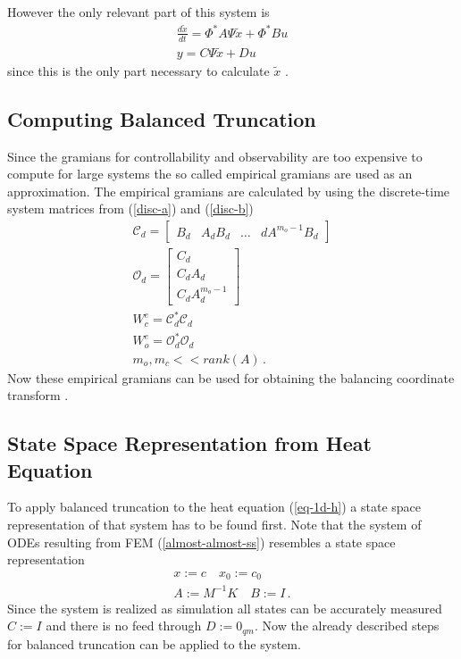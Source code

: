 However the only relevant part of this system is
\begin{gather}
\frac{d\tilde{x}}{dt} = \Phi^{*}A\Psi\tilde{x} + \Phi^{*}Bu \\
y = C\Psi\tilde{x} + Du  
\end{gather}
since this is the only part necessary to calculate \(\tilde{x}\)
\cite{brunton_kutz_2019e}.

\subsection{Computing Balanced Truncation}
Since the gramians for controllability and observability are too expensive to compute for large systems the so called empirical gramians are used as an approximation.
The empirical gramians are calculated by using the discrete-time system matrices from (\ref{disc-a}) and (\ref{disc-b})
\begin{gather}
\mathscr{C}_d = \begin{bmatrix}B_d & A_dB_d & \hdots & dA^{m_o -1}B_d\end{bmatrix} \\
\mathscr{O}_d = \begin{bmatrix}
C_d \\
C_dA_d \\
C_dA_d^{m_o - 1}
\end{bmatrix} \\
W_c^e = \mathscr{C}_d^{*}\mathscr{C}_d \\
W_o^e = \mathscr{O}_d^{*}\mathscr{O}_d \\
m_o, m_c << rank(A)  \,.
\end{gather}
Now these empirical gramians can be used for obtaining the balancing coordinate transform \cite{brunton_kutz_2019e}.

\subsection{State Space Representation from Heat Equation} \label{heat-ss}
To apply balanced truncation to the heat equation (\ref{eq-1d-h}) a state space representation of that system has to be found first.
Note that the system of ODEs resulting from FEM (\ref{almost-almost-ss}) resembles a state space representation
\begin{gather}
x := c \quad x_0 := c_0 \\
A := M^{-1}K \quad B:= I  \,.
\end{gather}
Since the system is realized as simulation all states can be accurately measured \(C := I\) and there is no feed through \(D := 0_{qm}\).
Now the already described steps for balanced truncation can be applied to the system.

